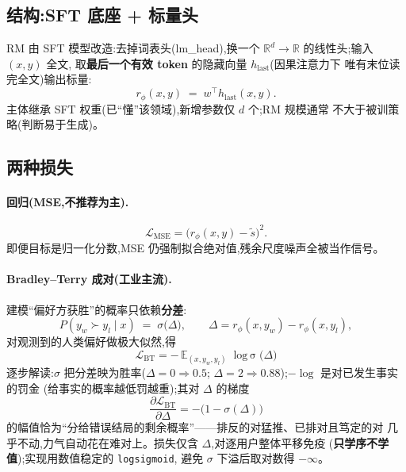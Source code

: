 \documentclass[UTF8, 11pt]{ctexart}
\DeclareMathOperator{\logsigmoid}{log\,\sigma}
\begin{document}
\subsection{结构:SFT 底座 + 标量头}

RM 由 SFT 模型改造:去掉词表头(lm\_head),换一个
$\mathbb{R}^{d}\!\to\!\mathbb{R}$ 的线性头;输入 $(x,y)$ 全文,
取\textbf{最后一个有效 token} 的隐藏向量 $h_{\text{last}}$(因果注意力下
唯有末位读完全文)输出标量:
\begin{equation}
r_\phi(x,y) \;=\; w^\top h_{\text{last}}(x,y).
\label{eq:rmhead}
\end{equation}
主体继承 SFT 权重(已``懂''该领域),新增参数仅 $d$ 个;RM 规模通常
不大于被训策略(判断易于生成)。

\subsection{两种损失}

\paragraph{回归(MSE,不推荐为主).}
\begin{equation}
\mathcal{L}_{\text{MSE}}=\bigl(r_\phi(x,y)-\tilde s\bigr)^2 .
\label{eq:mse}
\end{equation}
即便目标是归一化分数,MSE 仍强制拟合绝对值,残余尺度噪声全被当作信号。

\paragraph{Bradley--Terry 成对(工业主流).}
建模``偏好方获胜''的概率只依赖\textbf{分差}:
\begin{equation}
P(y_w \succ y_l \mid x)\;=\;\sigma\bigl(\Delta\bigr),
\qquad
\Delta = r_\phi(x,y_w)-r_\phi(x,y_l),
\label{eq:bt-model}
\end{equation}
对观测到的人类偏好做极大似然,得
\begin{equation}
\boxed{\;
\mathcal{L}_{\text{BT}}
=-\,\mathbb{E}_{(x,y_w,y_l)}\;\logsigmoid\!\bigl(\Delta\bigr)\;}
\label{eq:bt}
\end{equation}
逐步解读:$\sigma$ 把分差映为胜率($\Delta{=}0\Rightarrow 0.5$;
$\Delta{=}2\Rightarrow 0.88$);$-\log$ 是对已发生事实的罚金
(给事实的概率越低罚越重);其对 $\Delta$ 的梯度
\begin{equation}
\frac{\partial \mathcal{L}_{\text{BT}}}{\partial \Delta}
=-\bigl(1-\sigma(\Delta)\bigr)
\label{eq:btgrad}
\end{equation}
的幅值恰为``分给错误结局的剩余概率''——排反的对猛推、已排对且笃定的对
几乎不动,力气自动花在难对上。损失仅含 $\Delta$,对逐用户整体平移免疫
(\textbf{只学序不学值});实现用数值稳定的 \texttt{logsigmoid},
避免 $\sigma$ 下溢后取对数得 $-\infty$。
\end{document}
